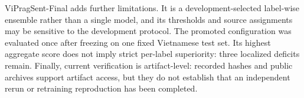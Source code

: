 ViPragSent-Final adds further limitations.  It is a development-selected label-wise ensemble rather than a single model, and its thresholds and source assignments may be sensitive to the development protocol.  The promoted configuration was evaluated once after freezing on one fixed Vietnamese test set.  Its highest aggregate score does not imply strict per-label superiority: three localized deficits remain.  Finally, current verification is artifact-level: recorded hashes and public archives support artifact access, but they do not establish that an independent rerun or retraining reproduction has been completed.
